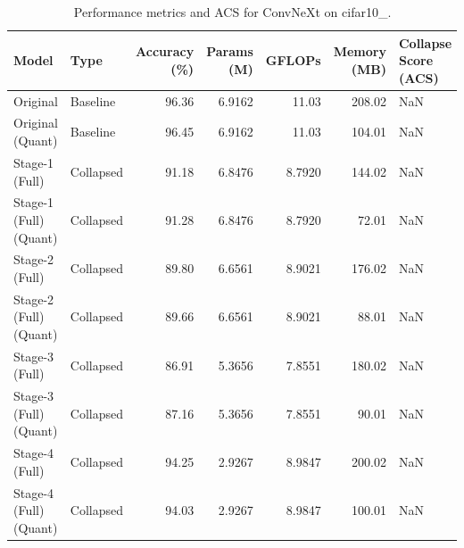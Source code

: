 \begin{table}
\caption{Performance metrics and ACS for ConvNeXt on cifar10_.}
\label{tab:ConvNeXt_cifar10_}
\begin{tabular}{llrrrrl}
\toprule
Model & Type & Accuracy (\%) & Params (M) & GFLOPs & Memory (MB) & Collapse Score (ACS) \\
\midrule
Original & Baseline & 96.36 & 6.9162 & 11.03 & 208.02 & NaN \\
Original
(Quant) & Baseline & 96.45 & 6.9162 & 11.03 & 104.01 & NaN \\
Stage-1 (Full) & Collapsed & 91.18 & 6.8476 & 8.7920 & 144.02 & NaN \\
Stage-1 (Full)
(Quant) & Collapsed & 91.28 & 6.8476 & 8.7920 & 72.01 & NaN \\
Stage-2 (Full) & Collapsed & 89.80 & 6.6561 & 8.9021 & 176.02 & NaN \\
Stage-2 (Full)
(Quant) & Collapsed & 89.66 & 6.6561 & 8.9021 & 88.01 & NaN \\
Stage-3 (Full) & Collapsed & 86.91 & 5.3656 & 7.8551 & 180.02 & NaN \\
Stage-3 (Full)
(Quant) & Collapsed & 87.16 & 5.3656 & 7.8551 & 90.01 & NaN \\
Stage-4 (Full) & Collapsed & 94.25 & 2.9267 & 8.9847 & 200.02 & NaN \\
Stage-4 (Full)
(Quant) & Collapsed & 94.03 & 2.9267 & 8.9847 & 100.01 & NaN \\
\bottomrule
\end{tabular}
\end{table}
